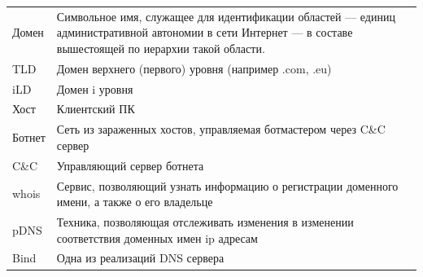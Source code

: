\documentclass[a4paper,14pt]{extreport} %
\begin{document}
\begin{table}[H]
\begin{tabular}{|p{3cm}| p{10cm}|}
		Домен   & Символьное имя, служащее для идентификации областей — единиц административной автономии в сети Интернет — в составе вышестоящей по иерархии такой области. \\ 
		TLD          & Домен верхнего (первого) уровня (например .com, .eu)                                                                                                                                                                                                           \\
		iLD          & Домен i уровня                                                                                                                                                                                                                                                                        \\
		Хост     & Клиентский ПК                                                                                                                                                                                                                                                                        \\
		Ботнет & Сеть из зараженных хостов, управляемая ботмастером через C\&C сервер                                                                                                                                                                      \\
		C\&C         & Управляющий сервер ботнета                                                                                                                                                                                                                                               \\
		whois        & Сервис, позволяющий узнать информацию о регистрации доменного имени, а также о его владельце                                                                                                                       \\
		pDNS         & Техника, позволяющая отслеживать изменения в изменении соответствия доменных имен ip адресам                                                                                                                      \\
		Bind         & Одна из реализаций DNS сервера                                                                                                                                                                                                                                            \\
		\hline
				
	\end{tabular}
\end{table}
	
\end{document}
